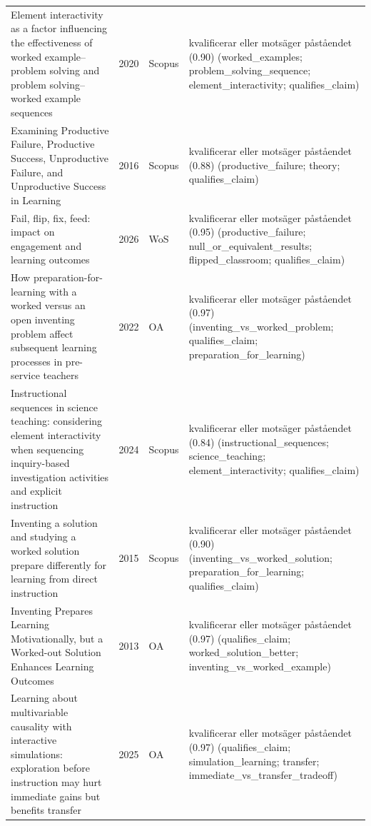 \begin{longtable}{@{}%
  >{\raggedright\arraybackslash}p{}c%
  >{\raggedright\arraybackslash}p{}%
  >{\raggedright\arraybackslash\footnotesize}p{}@{}}
Element interactivity as a factor influencing the effectiveness of worked example--problem solving and problem solving--worked example sequences & 2020 & Scopus & kvalificerar eller motsäger påståendet (0.90) (worked\_\allowbreak{}examples; problem\_\allowbreak{}solving\_\allowbreak{}sequence; element\_\allowbreak{}interactivity; qualifies\_\allowbreak{}claim) \\
Examining Productive Failure, Productive Success, Unproductive Failure, and Unproductive Success in Learning & 2016 & Scopus & kvalificerar eller motsäger påståendet (0.88) (productive\_\allowbreak{}failure; theory; qualifies\_\allowbreak{}claim) \\
Fail, flip, fix, feed: impact on engagement and learning outcomes & 2026 & WoS & kvalificerar eller motsäger påståendet (0.95) (productive\_\allowbreak{}failure; null\_\allowbreak{}or\_\allowbreak{}equivalent\_\allowbreak{}results; flipped\_\allowbreak{}classroom; qualifies\_\allowbreak{}claim) \\
How preparation-for-learning with a worked versus an open inventing problem affect subsequent learning processes in pre-service teachers & 2022 & OA & kvalificerar eller motsäger påståendet (0.97) (inventing\_\allowbreak{}vs\_\allowbreak{}worked\_\allowbreak{}problem; qualifies\_\allowbreak{}claim; preparation\_\allowbreak{}for\_\allowbreak{}learning) \\
Instructional sequences in science teaching: considering element interactivity when sequencing inquiry-based investigation activities and explicit instruction & 2024 & Scopus & kvalificerar eller motsäger påståendet (0.84) (instructional\_\allowbreak{}sequences; science\_\allowbreak{}teaching; element\_\allowbreak{}interactivity; qualifies\_\allowbreak{}claim) \\
Inventing a solution and studying a worked solution prepare differently for learning from direct instruction & 2015 & Scopus & kvalificerar eller motsäger påståendet (0.90) (inventing\_\allowbreak{}vs\_\allowbreak{}worked\_\allowbreak{}solution; preparation\_\allowbreak{}for\_\allowbreak{}learning; qualifies\_\allowbreak{}claim) \\
Inventing Prepares Learning Motivationally, but a Worked-out Solution Enhances Learning Outcomes & 2013 & OA & kvalificerar eller motsäger påståendet (0.97) (qualifies\_\allowbreak{}claim; worked\_\allowbreak{}solution\_\allowbreak{}better; inventing\_\allowbreak{}vs\_\allowbreak{}worked\_\allowbreak{}example) \\
Learning about multivariable causality with interactive simulations: exploration before instruction may hurt immediate gains but benefits transfer & 2025 & OA & kvalificerar eller motsäger påståendet (0.97) (qualifies\_\allowbreak{}claim; simulation\_\allowbreak{}learning; transfer; immediate\_\allowbreak{}vs\_\allowbreak{}transfer\_\allowbreak{}tradeoff) \\

\end{longtable}
